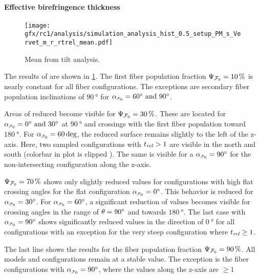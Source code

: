 \paragraph{Effective birefringence thickness \trel{}}
%
\begin{figure}[!p]
    \centering
    \texttt{[image: gfx/rc1/analysis/simulation\_analysis\_hist\_0.5\_setup\_PM\_s\_Vervet\_m\_r\_rtrel\_mean.pdf]}
    \caption{Mean \trel{} from tilt analysis.}
    \label{fig:sim_ana_trel}
\end{figure}
% 
The results of \trel{} are shown in \cref{fig:sim_ana_trel}.
The first fiber population fraction $\textnormal{$\Psi_{\textnormal{$\mathcal{F}_0$}}$}=\SI{10}{\percent}$ 
is nearly constant for all fiber configurations.
The exceptions are secondary fiber population inclinations of $\SI{90}{\degree}$ for $\modelInc=\SIlist{60;90}{\degree}$.
\par
% 
Areas of reduced \trel{} become visible for $\textnormal{$\Psi_{\textnormal{$\mathcal{F}_0$}}$}=\SI{30}{\percent}$.
These are located for $\modelInc=\SIlist{0;30}{\degree}$ at $\SI{90}{\degree}$ and crossings with the first fiber population toward $\SI{180}{\degree}$.
For $\modelInc=\SI{60}{\deg}$, the reduced \trel{} surface remains slightly to the left of the z-axis.
Here, two sampled configurations with $\textnormal{$t_\mathit{rel}$} > 1$ are visible in the north and south (colorbar in plot is clipped ).
The same is visible for a $\modelInc=\SI{90}{\degree}$ for the non-intersecting configuration along the z-axis.
\par
% 
$\textnormal{$\Psi_{\textnormal{$\mathcal{F}_0$}}$}=\SI{70}{\percent}$ shows only slightly reduced \trel{} values for configurations with high flat crossing angles for the flat configuration $\modelInc=\SI{0}{\degree}$.
This behavior is reduced for $\modelInc=\SI{30}{\degree}$.
For $\modelInc=\SI{60}{\degree}$, a significant reduction of \trel{} values becomes visible for crossing angles in the range of $\textnormal{$\theta$}=\SI{90}{\degree}$ and towards $\SI{180}{\degree}$.
The last case with $\modelInc=\SI{90}{\degree}$ shows significantly reduced \trel{} values in the direction of $\SI{0}{\degree}$ for all configurations with an exception for the very steep configuration where $\textnormal{$t_\mathit{rel}$} \geq \SI{1}{}$.
\par
% 
The last line shows the results for the fiber population fraction $\textnormal{$\Psi_{\textnormal{$\mathcal{F}_0$}}$}=\SI{90}{\percent}$.
All models and configurations remain at a stable \trel{} value.
The exception is the fiber configurations with $\modelInc=\SI{90}{\degree}$, where the \trel{} values along the z-axis are $\geq \SI{1}{}$
%
